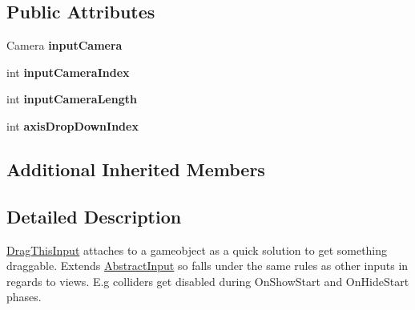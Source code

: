 \subsection*{Public Attributes}
\begin{DoxyCompactItemize}
\item 
\hypertarget{class_scaffolding_1_1_drag_this_input_a039e22da594026e35be5e1ed4abb9c1d}{Camera {\bfseries input\-Camera}}\label{class_scaffolding_1_1_drag_this_input_a039e22da594026e35be5e1ed4abb9c1d}

\item 
\hypertarget{class_scaffolding_1_1_drag_this_input_a6ce7f9342173a57e81b666fdd3162c8f}{int {\bfseries input\-Camera\-Index}}\label{class_scaffolding_1_1_drag_this_input_a6ce7f9342173a57e81b666fdd3162c8f}

\item 
\hypertarget{class_scaffolding_1_1_drag_this_input_a955fd31f5d266ed13258c695c323ef7e}{int {\bfseries input\-Camera\-Length}}\label{class_scaffolding_1_1_drag_this_input_a955fd31f5d266ed13258c695c323ef7e}

\item 
\hypertarget{class_scaffolding_1_1_drag_this_input_a923518138b1f4ab3842f44db144f6d22}{int {\bfseries axis\-Drop\-Down\-Index}}\label{class_scaffolding_1_1_drag_this_input_a923518138b1f4ab3842f44db144f6d22}

\end{DoxyCompactItemize}
\subsection*{Additional Inherited Members}


\subsection{Detailed Description}
\hyperlink{class_scaffolding_1_1_drag_this_input}{Drag\-This\-Input} attaches to a gameobject as a quick solution to get something draggable. Extends \hyperlink{class_scaffolding_1_1_abstract_input}{Abstract\-Input} so falls under the same rules as other inputs in regards to views. E.\-g colliders get disabled during On\-Show\-Start and On\-Hide\-Start phases. 



